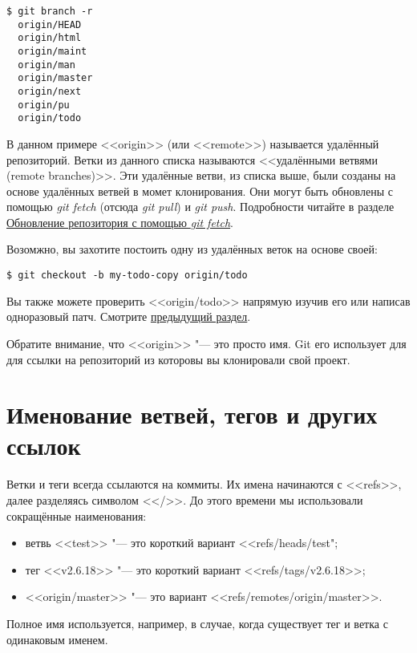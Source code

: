 \documentclass[a4paper, 12pt]{report}
\begin{document}
\begin{lstlisting}
$ git branch -r
  origin/HEAD
  origin/html
  origin/maint
  origin/man
  origin/master
  origin/next
  origin/pu
  origin/todo
\end{lstlisting}

В данном примере <<origin>> (или <<remote>>) называется удалённый репозиторий. 
Ветки из данного списка называются <<удалёнными ветвями (remote branches)>>. 
Эти удалённые ветви, из списка выше, были созданы на основе удалённых ветвей в 
момет клонирования. Они могут быть обновлены с помощью \emph{git fetch} (отсюда
\emph{git pull}) и \emph{git push}. Подробности читайте в разделе 
\href{#chapter1:update-a-repository-with-git-fetch}{Обновление репозитория с помощью
\emph{git fetch}}.

Возомжно, вы захотите постоить одну из удалённых веток на основе своей:

\begin{lstlisting}
$ git checkout -b my-todo-copy origin/todo
\end{lstlisting}

Вы также можете проверить <<origin/todo>> напрямую изучив его или написав одноразовый
патч. Смотрите \href{#chapter1:examining-an-old-version-without-creating-a-new-branch}
{предыдущий раздел}.

Обратите внимание, что <<origin>> "--- это просто имя. Git его использует для 
для ссылки на репозиторий из которовы вы клонировали свой проект.


\section{Именование ветвей, тегов и других ссылок}

Ветки и теги всегда ссылаются на коммиты. Их имена начинаются с <<refs>>, далее
разделяясь символом <</>>. До этого времени мы использовали сокращённые наименования:

\begin{itemize}
\item ветвь <<test>> "--- это короткий вариант <<refs/heads/test";
\item тег <<v2.6.18>> "--- это короткий вариант <<refs/tags/v2.6.18>>;
\item <<origin/master>> "--- это вариант <<refs/remotes/origin/master>>.
\end{itemize}

Полное имя используется, например, в случае, когда существует тег и ветка с 
одинаковым именем.
\end{document}
